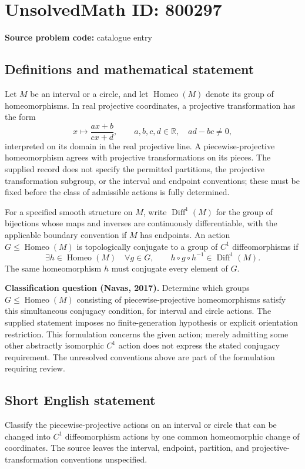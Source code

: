 \documentclass[11pt]{article}
\newcommand{\R}{\mathbb{R}}
\begin{document}
\section*{UnsolvedMath ID: 800297}
\textbf{Source problem code:} catalogue entry
\subsection{Definitions and mathematical statement}
Let \(M\) be an interval or a circle, and let \(\operatorname{Homeo}(M)\) denote its group of homeomorphisms. In real projective coordinates, a projective transformation has the form
\[
x\longmapsto \frac{ax+b}{cx+d},\qquad a,b,c,d\in\R,\quad ad-bc\ne0,
\]
interpreted on its domain in the real projective line. A piecewise-projective homeomorphism agrees with projective transformations on its pieces. The supplied record does not specify the permitted partitions, the projective transformation subgroup, or the interval and endpoint conventions; these must be fixed before the class of admissible actions is fully determined.

For a specified smooth structure on \(M\), write \(\operatorname{Diff}^{1}(M)\) for the group of bijections whose maps and inverses are continuously differentiable, with the applicable boundary convention if \(M\) has endpoints. An action \(G\leq\operatorname{Homeo}(M)\) is topologically conjugate to a group of \(C^{1}\) diffeomorphisms if
\[
\exists h\in\operatorname{Homeo}(M)\quad
\forall g\in G,\qquad h\circ g\circ h^{-1}\in\operatorname{Diff}^{1}(M).
\]
The same homeomorphism \(h\) must conjugate every element of \(G\).

\textbf{Classification question (Navas, 2017).} Determine which groups \(G\leq\operatorname{Homeo}(M)\) consisting of piecewise-projective homeomorphisms satisfy this simultaneous conjugacy condition, for interval and circle actions. The supplied statement imposes no finite-generation hypothesis or explicit orientation restriction. This formulation concerns the given action; merely admitting some other abstractly isomorphic \(C^{1}\) action does not express the stated conjugacy requirement. The unresolved conventions above are part of the formulation requiring review.
\subsection{Short English statement}
Classify the piecewise-projective actions on an interval or circle that can be changed into \(C^{1}\) diffeomorphism actions by one common homeomorphic change of coordinates. The source leaves the interval, endpoint, partition, and projective-transformation conventions unspecified.
\end{document}
